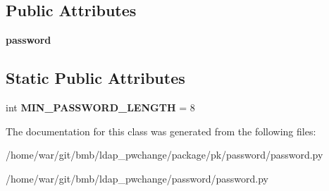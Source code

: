 \subsection*{Public Attributes}
\begin{DoxyCompactItemize}
\item 
\hypertarget{classpassword_1_1password_1_1Password_af18948ec9e5c61653ced91ce2555d9f9}{{\bfseries password}}\label{classpassword_1_1password_1_1Password_af18948ec9e5c61653ced91ce2555d9f9}

\end{DoxyCompactItemize}
\subsection*{Static Public Attributes}
\begin{DoxyCompactItemize}
\item 
\hypertarget{classpassword_1_1password_1_1Password_a09e72c280f4675f10b9202cf30b56fce}{int {\bfseries M\-I\-N\-\_\-\-P\-A\-S\-S\-W\-O\-R\-D\-\_\-\-L\-E\-N\-G\-T\-H} = 8}\label{classpassword_1_1password_1_1Password_a09e72c280f4675f10b9202cf30b56fce}

\end{DoxyCompactItemize}


The documentation for this class was generated from the following files\-:\begin{DoxyCompactItemize}
\item 
/home/war/git/bmb/ldap\-\_\-pwchange/package/pk/password/password.\-py\item 
/home/war/git/bmb/ldap\-\_\-pwchange/password/password.\-py\end{DoxyCompactItemize}

